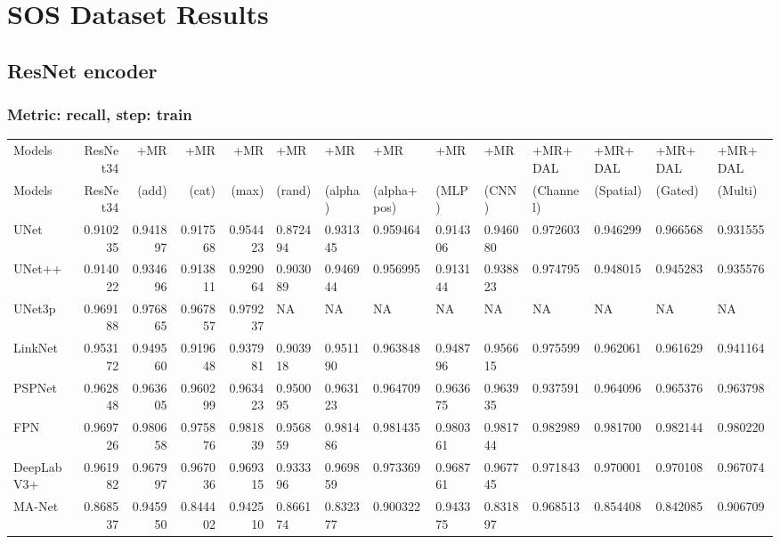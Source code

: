 \documentclass{article}
\begin{document}
\section{SOS Dataset Results}

\subsection{ResNet encoder}
\subsubsection{Metric: recall, step: train}
\begin{tabular}{lrrrrlllllllll}
\toprule
Models & ResNet34 & +MR  & +MR  & +MR  & +MR  & +MR  & +MR  & +MR  & +MR  & +MR+DAL & +MR+DAL & +MR+DAL & +MR+DAL \\
Models & ResNet34 &  (add) &  (cat) &  (max) &  (rand) &  (alpha) &  (alpha+pos) &  (MLP) &  (CNN) & (Channel) & (Spatial) & (Gated) & (Multi) \\
\midrule
UNet & 0.910235 & 0.941897 & 0.917568 & 0.954423 & 0.872494 & 0.931345 & 0.959464 & 0.914306 & 0.946080 & 0.972603 & 0.946299 & 0.966568 & 0.931555 \\
UNet++ & 0.914022 & 0.934696 & 0.913811 & 0.929064 & 0.903089 & 0.946944 & 0.956995 & 0.913144 & 0.938823 & 0.974795 & 0.948015 & 0.945283 & 0.935576 \\
UNet3p & 0.969188 & 0.976865 & 0.967857 & 0.979237 & NA & NA & NA & NA & NA & NA & NA & NA & NA \\
LinkNet & 0.953172 & 0.949560 & 0.919648 & 0.937981 & 0.903918 & 0.951190 & 0.963848 & 0.948796 & 0.956615 & 0.975599 & 0.962061 & 0.961629 & 0.941164 \\
PSPNet & 0.962848 & 0.963605 & 0.960299 & 0.963423 & 0.950095 & 0.963123 & 0.964709 & 0.963675 & 0.963935 & 0.937591 & 0.964096 & 0.965376 & 0.963798 \\
FPN & 0.969726 & 0.980658 & 0.975876 & 0.981839 & 0.956859 & 0.981486 & 0.981435 & 0.980361 & 0.981744 & 0.982989 & 0.981700 & 0.982144 & 0.980220 \\
DeepLabV3+ & 0.961982 & 0.967997 & 0.967036 & 0.969315 & 0.933396 & 0.969859 & 0.973369 & 0.968761 & 0.967745 & 0.971843 & 0.970001 & 0.970108 & 0.967074 \\
MA-Net & 0.868537 & 0.945950 & 0.844402 & 0.942510 & 0.866174 & 0.832377 & 0.900322 & 0.943375 & 0.831897 & 0.968513 & 0.854408 & 0.842085 & 0.906709 \\
\bottomrule
\end{tabular}
\end{document}

